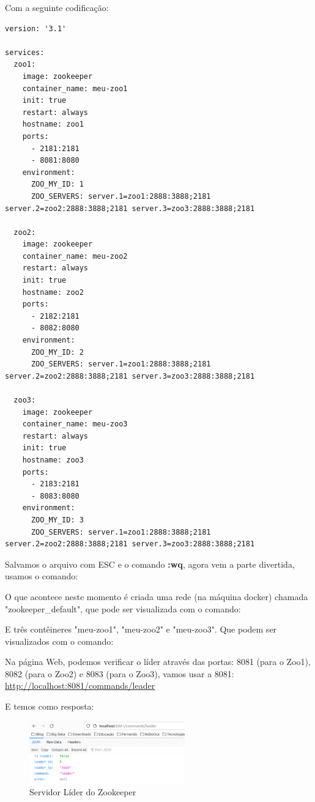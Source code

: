 \documentclass[a4paper,11pt]{article}
\begin{document}
Com a seguinte codificação:
\begin{lstlisting}[]
version: '3.1'

services:
  zoo1:
    image: zookeeper
    container_name: meu-zoo1
    init: true
    restart: always
    hostname: zoo1
    ports:
      - 2181:2181
      - 8081:8080
    environment:
      ZOO_MY_ID: 1
      ZOO_SERVERS: server.1=zoo1:2888:3888;2181 server.2=zoo2:2888:3888;2181 server.3=zoo3:2888:3888;2181

  zoo2:
    image: zookeeper
    container_name: meu-zoo2
    restart: always
    init: true
    hostname: zoo2
    ports:
      - 2182:2181
      - 8082:8080 
    environment:
      ZOO_MY_ID: 2
      ZOO_SERVERS: server.1=zoo1:2888:3888;2181 server.2=zoo2:2888:3888;2181 server.3=zoo3:2888:3888;2181

  zoo3:
    image: zookeeper
    container_name: meu-zoo3
    restart: always
    init: true
    hostname: zoo3
    ports:
      - 2183:2181
      - 8083:8080
    environment:
      ZOO_MY_ID: 3
      ZOO_SERVERS: server.1=zoo1:2888:3888;2181 server.2=zoo2:2888:3888;2181 server.3=zoo3:2888:3888;2181
\end{lstlisting}

Salvamos o arquivo com ESC e o comando \textbf{:wq}, agora vem a parte divertida, usamos o comando: \\

O que acontece neste momento é criada uma rede (na máquina docker) chamada "zookeeper\_default", que pode ser visualizada com o comando: \\

E três contêineres "meu-zoo1", "meu-zoo2" e "meu-zoo3". Que podem ser visualizados com o comando: \\

Na página Web, podemos verificar o líder através das portas: 8081 (para o Zoo1), 8082 (para o Zoo2) e 8083 (para o Zoo3), vamos usar a 8081: \\
\url{http://localhost:8081/commands/leader}

E temos como resposta:
\begin{figure}[H]
	\centering
	\includegraphics[width=0.6\textwidth]{imagem/lider3}
	\caption{Servidor Líder do Zookeeper}
\end{figure}
\end{document}
